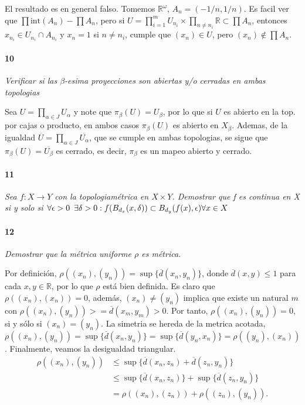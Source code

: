 \documentclass[12pt]{article}
\begin{document}
El resultado es en general falso. Tomemos $\mathbb{R}^\omega$, $A_n=\left(-1/n,1/n\right)$. Es facil ver que $\prod \text{int}(A_n)-\prod A_n$, pero si $U=\prod_{i=1}^{m} U_{n_i} \times \prod_{n\neq n_i} \mathbb{R} \subset \prod A_n$,
entonces $x_{n_i} \in U_{n_i} \cap A_{n_i}$ y $x_n=1$ si $n \neq n_i$, cumple que $(x_n) \in U$, pero $(x_n) \notin \prod A_n$.
\paragraph{10}
\textit{Verificar si las $\beta$-esima proyecciones son abiertas y/o cerradas en ambas topologias}

Sea $U=\prod_{\alpha \in J} U_\alpha$ y note que $\pi_\beta(U)=U_\beta$, por lo que si $U$ es abierto en la top. por cajas o producto, en ambos casos $\pi_\beta(U)$ es abierto en $X_\beta$.
Ademas, de la igualdad $\overline{U}=\prod_{\alpha \in J} \overline{U_\alpha}$, que se cumple en ambas topologias, se sigue que $\pi_\beta(U)=\overline{U_\beta}$ es cerrado, es decir, $\pi_\beta$ es un mapeo abierto y cerrado.
\paragraph{11}
\textit{Sea $f:X\rightarrow Y$ con la topologiamétrica en $X\times Y$. Demostrar que f es continua en X si y solo si $\forall\epsilon>0\hspace{5px}\exists\delta>0 : f(B_{d_x}(x,\delta))\subset B_{d_y}(f(x),\epsilon) \forall x\in X$}

\paragraph{12}
\textit{Demostrar que la métrica uniforme $\rho$ es métrica.}

Por definición, $\rho((x_n),(y_n))=\sup{\{\overline{d}(x_n,y_n)\}}$, donde $\overline{d}(x,y) \leq 1$ para cada $x,y \in \mathbb{R}$, por lo que $\rho$ está bien definida.
Es claro que $\rho((x_n),(x_n))=0$, además, $(x_n) \neq (y_n)$ implica que existe un natural $m$ con $\rho((x_n),(y_n))>=\overline{d}(x_m,y_m)>0$. Por tanto, $\rho((x_n),(y_n))=0$, si y sólo si $(x_n)=(y_n)$.
La simetria se hereda de la metrica acotada, $\rho((x_n),(y_n))=\sup{\{\overline{d}(x_n,y_n)\}}=\sup{\{\overline{d}(y_n,x_n)\}}=\rho((y_n),(x_n))$. Finalmente, veamos la desigualdad triangular.
\begin{align*}
    \rho((x_n),(y_n)) &\leq \sup{\{\overline{d}(x_n,z_n)+\overline{d}(z_n,y_n)\}} \\
                      &\leq \sup{\{\overline{d}(x_n,z_n)\}}+\sup{\{\overline{d}(z_n,y_n)\}}\\
                      &=\rho((x_n),(z_n))+\rho((z_n),(y_n)).
\end{align*}
\end{document}
